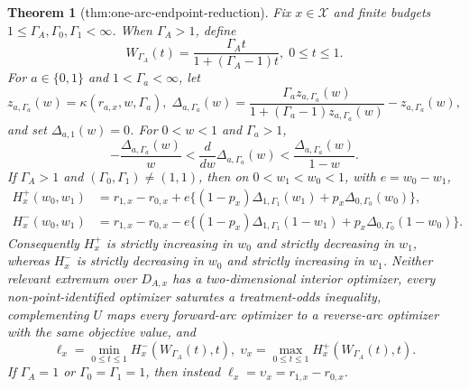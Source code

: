 \documentclass{article}
\newtheorem{theorem}{Theorem}
\begin{document}
\begin{theorem}[thm:one-arc-endpoint-reduction]\label{thm:one-arc-endpoint-reduction}
Fix \(x\in\mathcal X\) and finite budgets \(1\leq\Gamma_A,\Gamma_0,\Gamma_1<\infty\).  When \(\Gamma_A>1\), define
\[
 W_{\Gamma_A}(t)=\frac{\Gamma_A t}{1+(\Gamma_A-1)t},\; 0\leq t\leq1.
\]
For \(a\in\{0,1\}\) and \(1<\Gamma_a<\infty\), let
\[
 z_{a,\Gamma_a}(w)=\kappa(r_{a,x},w,\Gamma_a),\;
 \Delta_{a,\Gamma_a}(w)=
 \frac{\Gamma_a z_{a,\Gamma_a}(w)}
      {1+(\Gamma_a-1)z_{a,\Gamma_a}(w)}-z_{a,\Gamma_a}(w),
\]
and set \(\Delta_{a,1}(w)=0\).  For \(0<w<1\) and \(\Gamma_a>1\),
\[
 -\frac{\Delta_{a,\Gamma_a}(w)}{w}
 <\frac{d}{dw}\Delta_{a,\Gamma_a}(w)
 <\frac{\Delta_{a,\Gamma_a}(w)}{1-w}.
\]
If \(\Gamma_A>1\) and \((\Gamma_0,\Gamma_1)\neq(1,1)\), then on \(0<w_1<w_0<1\), with \(e=w_0-w_1\),
\[
\begin{aligned}
H_x^+(w_0,w_1)
 &=r_{1,x}-r_{0,x}
 +e\{(1-p_x)\Delta_{1,\Gamma_1}(w_1)
       +p_x\Delta_{0,\Gamma_0}(w_0)\},\\
H_x^-(w_0,w_1)
 &=r_{1,x}-r_{0,x}
 -e\{(1-p_x)\Delta_{1,\Gamma_1}(1-w_1)
       +p_x\Delta_{0,\Gamma_0}(1-w_0)\}.
\end{aligned}
\]
Consequently \(H_x^+\) is strictly increasing in \(w_0\) and strictly decreasing in \(w_1\), whereas \(H_x^-\) is strictly decreasing in \(w_0\) and strictly increasing in \(w_1\).  Neither relevant extremum over \(D_{A,x}\) has a two-dimensional interior optimizer, every non-point-identified optimizer saturates a treatment-odds inequality, complementing \(U\) maps every forward-arc optimizer to a reverse-arc optimizer with the same objective value, and
\[
 \ell_x=\min_{0\leq t\leq1}H_x^-(W_{\Gamma_A}(t),t),
 \;
 \upsilon_x=\max_{0\leq t\leq1}H_x^+(W_{\Gamma_A}(t),t).
\]
If \(\Gamma_A=1\) or \(\Gamma_0=\Gamma_1=1\), then instead
\(\ell_x=\upsilon_x=r_{1,x}-r_{0,x}\).
\end{theorem}
\end{document}
